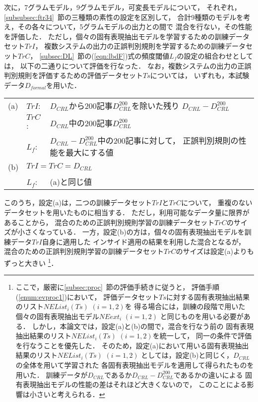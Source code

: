 次に，7グラムモデル，9グラムモデル，可変長モデルについて，
それぞれ，\ref{subsubsec:ftr34}~節の三種類の素性の設定を区別して，
合計9種類のモデルを考え，その各々について，5グラムモデルの出力との間で
混合を行ない，その性能を評価した．
ただし，個々の固有表現抽出モデルを学習するための訓練データセット$TrI$，
複数システムの出力の正誤判別規則を学習するための訓練データセット$TrC$，
\ref{subsec:DL}~節の(\ref{eqn:lbdF})式の頻度閾値$L_f$の設定の組合わせとしては，
以下の二通りについて評価を行なった．
なお，複数システムの出力の正誤判別規則を評価するための評価データセット$Ts$については，
いずれも，本試験データ$D_{formal}$を用いた．
\begin{center}
\begin{tabular}{lll}
(a) & $TrI$: & $D_{CRL}$から200記事$D^{200}_{CRL}$を除いた残り 
 $D_{CRL}-D^{200}_{CRL}$\\
    & $TrC$: & $D_{CRL}$中の200記事$D^{200}_{CRL}$\\
    & $L_f$: & $D_{CRL}-D^{200}_{CRL}$中の200記事に対して，
正誤判別規則の性能を最大にする値\\
(b) & \multicolumn{2}{l}{$TrI=TrC=D_{CRL}$}\\
    & $L_f$: & (a)と同じ値 
\end{tabular}
\end{center}
このうち，設定(a)は，二つの訓練データセット$TrI$と$TrC$について，
重複のないデータセットを用いたものに相当する．
ただし，利用可能なデータ量に限界があることから，
混合のための正誤判別規則学習の訓練データセット$TrC$のサイズが小さくなっている．
一方，設定(b)の方は，個々の固有表現抽出モデルを訓練データ$TrI$自身に適用した
インサイド適用の結果を利用した混合となるが，
混合のための正誤判別規則学習の訓練データセット$TrC$のサイズは設定(a)よりもずっと大きい
\footnote{
  ここで，厳密に\ref{subsec:proc}~節の評価手続きに従うと，
  評価手順(\ref{enum:evproc1})において，
  評価データセット$Ts$に対する固有表現抽出結果のリスト$NEList_i(Ts)$ $(i=1,2)$を
  得る場合には，訓練の段階で用いた個々の固有表現抽出モデル$NEext_i$ $(i=1,2)$
  と同じものを用いる必要がある．
  しかし，本論文では，設定(a)と(b)の間で，混合を行なう前の
  固有表現抽出結果のリスト$NEList_i(Ts)$ $(i=1,2)$を統一して，
  同一の条件で評価を行なうことを優先した．
  そのため，設定(a)において用いる固有表現抽出結果のリスト$NEList_i(Ts)$ $(i=1,2)$
  としては，設定(b)と同じく，$D_{CRL}$の全体を用いて学習された
  各固有表現抽出モデルを適用して得られたものを用いた．
  訓練データが$D_{CRL}$であるか$D_{CRL}-D^{200}_{CRL}$であるかの違いによる
  固有表現抽出モデルの性能の差はそれほど大きくないので，
  このことによる影響は小さいと考えられる．
}．

